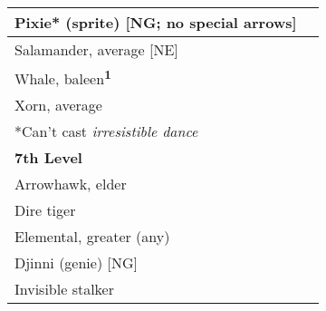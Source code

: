 \begin{longtable}{ll}
{\begin{minipage}[t]{3.857in}
Pixie* (sprite) [NG; no special arrows]\end{minipage}}\\
\hline
\multicolumn{2}{|p{3.857in}|}{\begin{minipage}[t]{3.857in}\raggedright
Salamander, average [NE]\end{minipage}}\\
\hline
\multicolumn{2}{|p{3.857in}|}{\begin{minipage}[t]{3.857in}\raggedright
Whale, baleen\textsuperscript{\textbf{1}}\end{minipage}}\\
\hline
\multicolumn{2}{|p{3.857in}|}{\begin{minipage}[t]{3.857in}\raggedright
Xorn, average\end{minipage}}\\
\hline
\multicolumn{2}{|p{3.857in}|}{\begin{minipage}[t]{3.857in}\raggedright
*Can't cast \textit{irresistible dance}\end{minipage}}\\
\hline
\multicolumn{2}{|p{3.857in}|}{\begin{minipage}[t]{3.857in}\raggedright
\textbf{7th Level}\end{minipage}}\\
\hline
\multicolumn{2}{|p{3.857in}|}{\begin{minipage}[t]{3.857in}\raggedright
Arrowhawk, elder\end{minipage}}\\
\hline
\multicolumn{2}{|p{3.857in}|}{\begin{minipage}[t]{3.857in}\raggedright
Dire tiger\end{minipage}}\\
\hline
\multicolumn{2}{|p{3.857in}|}{\begin{minipage}[t]{3.857in}\raggedright
Elemental, greater (any)\end{minipage}}\\
\hline
\multicolumn{2}{|p{3.857in}|}{\begin{minipage}[t]{3.857in}\raggedright
Djinni (genie) [NG]\end{minipage}}\\
\hline
\multicolumn{2}{|p{3.857in}|}{\begin{minipage}[t]{3.857in}\raggedright
Invisible stalker\end{minipage}}\\

\end{longtable}
